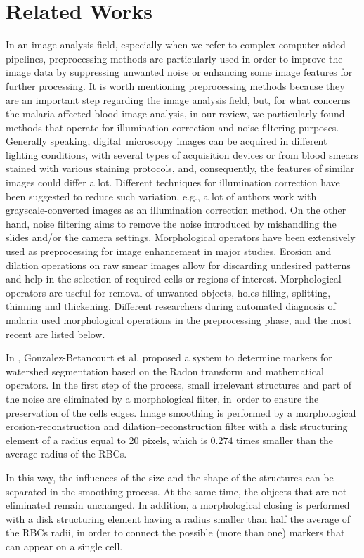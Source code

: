 \documentclass[final,a4paper,12pt,english]{UnicaPhdThesis3}
\begin{document}
	\section{Related Works}
	In an image analysis field, especially when we refer to complex computer-aided pipelines, preprocessing methods are particularly used in order to improve the image data by suppressing unwanted noise or enhancing some image features for further processing.
	It is worth mentioning preprocessing methods because they are an important step regarding the image analysis field, but, for what concerns the malaria-affected blood image analysis, in our review, we particularly found methods that operate for illumination correction and noise filtering purposes.
	Generally speaking, digital~microscopy images can be acquired in different lighting conditions, with several types of acquisition devices or from blood smears stained with various staining protocols, and, consequently, the features of similar images could differ a lot.
	Different techniques for illumination correction have been suggested to reduce such variation, e.g., a lot of authors work with grayscale-converted images as an illumination correction method.
	On the other hand, noise filtering aims to remove the noise introduced by mishandling the slides and/or the camera settings.
	Morphological operators have been extensively used as preprocessing for image enhancement in major studies.
	Erosion and dilation operations on raw smear images allow for discarding undesired patterns and help in the selection of required cells or regions of interest. Morphological operators are useful for removal of unwanted
	objects, holes filling, splitting, thinning and thickening. Different researchers during automated diagnosis of malaria used morphological operations in the preprocessing phase, and the most recent are listed below.
	
	In \cite{Gonzalez2016}, Gonzalez-Betancourt et al. proposed a system to determine markers for watershed segmentation based on the Radon transform and mathematical operators. In the first step of the process, small irrelevant structures and part of the noise are eliminated by a morphological filter, in~order to ensure the preservation of the cells edges. Image smoothing is performed by a morphological erosion-reconstruction and dilation--reconstruction filter with a disk structuring element of a radius equal to 20 pixels, which is $0.274$ times smaller than the average radius of the RBCs. 
	
	In this way, the influences of the size and the shape of the structures can be separated in the smoothing process. At the same time, the objects that are not eliminated remain unchanged. In addition, a morphological closing is performed with a disk structuring element having a radius smaller than half the average of the RBCs radii, in order to connect the possible (more than one) markers that can appear on a single cell.
	
\end{document}
